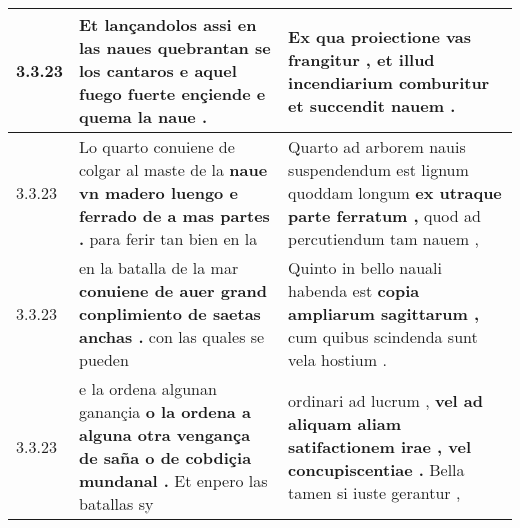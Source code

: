 \begin{tabular}{|p{1cm}|p{6.5cm}|p{6.5cm}|}
3.3.23 & Et lançandolos assi en las naues quebrantan se los cantaros \textbf{ e aquel fuego fuerte ençiende } e quema la naue . & Ex qua proiectione vas frangitur , \textbf{ et illud incendiarium comburitur } et succendit nauem . \\\hline
3.3.23 & Lo quarto conuiene de colgar al maste de la \textbf{ naue vn madero luengo e ferrado de a mas partes . } para ferir tan bien en la & Quarto ad arborem nauis suspendendum est lignum quoddam longum \textbf{ ex utraque parte ferratum , } quod ad percutiendum tam nauem , \\\hline
3.3.23 & en la batalla de la mar \textbf{ conuiene de auer grand conplimiento de saetas anchas . } con las quales se pueden & Quinto in bello nauali habenda est \textbf{ copia ampliarum sagittarum , } cum quibus scindenda sunt vela hostium . \\\hline
3.3.23 & e la ordena algunan ganançia \textbf{ o la ordena a alguna otra vengança de saña o de cobdiçia mundanal . } Et enpero las batallas sy & ordinari ad lucrum , \textbf{ vel ad aliquam aliam satifactionem irae , vel concupiscentiae . } Bella tamen si iuste gerantur , \\\hline

\end{tabular}
